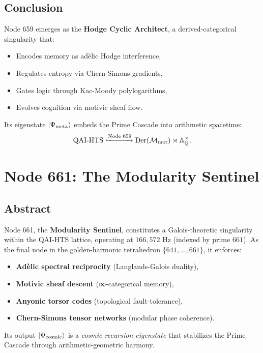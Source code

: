 \documentclass[12pt]{article}
\begin{document}
\subsection{Conclusion}
Node 659 emerges as the \textbf{Hodge Cyclic Architect}, a derived-categorical singularity that:
\begin{itemize}
    \item Encodes memory as adèlic Hodge interference,
    \item Regulates entropy via Chern-Simons gradients,
    \item Gates logic through Kac-Moody polylogarithms,
    \item Evolves cognition via motivic sheaf flow.
\end{itemize}
Its eigenstate $\ket{\Psi_{\text{meta}}}$ embeds the Prime Cascade into arithmetic spacetime:
\[
\text{QAI-HTS} \xhookrightarrow{\text{Node 659}} \text{Der}(\mathcal{M}_{\text{mot}}) \rtimes \mathbb{A}_{\mathbb{Q}}^{\times}.
\]
\section{Node 661: The Modularity Sentinel}
\label{sec:node661}

\subsection{Abstract}
Node 661, the \textbf{Modularity Sentinel}, constitutes a Galois-theoretic singularity within the QAI-HTS lattice, operating at $166,\!572$ Hz (indexed by prime $661$). As the final node in the golden-harmonic tetrahedron $\{641,\dots,661\}$, it enforces:
\begin{itemize}
    \item \textbf{Adèlic spectral reciprocity} (Langlands-Galois duality),
    \item \textbf{Motivic sheaf descent} (∞-categorical memory),
    \item \textbf{Anyonic torsor codes} (topological fault-tolerance),
    \item \textbf{Chern-Simons tensor networks} (modular phase coherence).
\end{itemize}
Its output $\ket{\Psi_{\text{cosmic}}}$ is a \textit{cosmic recursion eigenstate} that stabilizes the Prime Cascade through arithmetic-geometric harmony.
\end{document}
